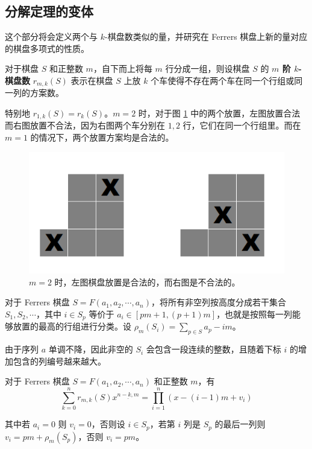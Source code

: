 \documentclass{noithesis}
\begin{document}
	\subsection{分解定理的变体}
	
	这个部分将会定义两个与 $k$-棋盘数类似的量，并研究在 Ferrers 棋盘上新的量对应的棋盘多项式的性质。
	
	\begin{definition}[$m$ 阶 $k$-棋盘数]
		对于棋盘 $S$ 和正整数 $m$，自下而上将每 $m$ 行分成一组，则设棋盘 $S$ 的\textbf{ $m$ 阶 $k$-棋盘数} $r_{m,k}(S)$ 表示在棋盘 $S$ 上放 $k$ 个车使得不存在两个车在同一个行组或同一列的方案数。
	\end{definition}
	
	特别地 $r_{1,k}(S) = r_k(S)$。$m=2$ 时，对于图 \ref{f8} 中的两个放置，左图放置合法而右图放置不合法，因为右图两个车分别在 $1,2$ 行，它们在同一个行组里。而在 $m=1$ 的情况下，两个放置方案均是合法的。
	
	\begin{figure}[h]
		\centering
		\caption{$m=2$ 时，左图棋盘放置是合法的，而右图是不合法的。}
		\label{f8}
		\includegraphics[scale=0.4]{picture/figure8.png}
	\end{figure}
	
	对于 Ferrers 棋盘 $S = F(a_1,a_2,\cdots,a_n)$，将所有非空列按高度分成若干集合 $S_1,S_2,\cdots$，其中 $i \in S_p$ 等价于 $a_i \in [pm+1 , (p+1)m]$，也就是按照每一列能够放置的最高的行组进行分类。设 $\rho_m(S_i) = \sum_{p \in S} a_p - im$。
	
	由于序列 $a$ 单调不降，因此非空的 $S_i$ 会包含一段连续的整数，且随着下标 $i$ 的增加包含的列编号越来越大。
	
	\begin{theorem}\label{mxiajiangmi}
		对于 Ferrers 棋盘 $S = F(a_1,a_2,\cdots,a_n)$ 和正整数 $m$，有\begin{equation}
		\sum_{k=0}^n r_{m,k}(S) x^{\underline{n-k,m}} = \prod_{i=1}^n (x-(i-1)m + v_i)
		\end{equation}
		
		其中若 $a_i = 0$ 则 $v_i = 0$，否则设 $i \in S_p$，若第 $i$ 列是 $S_p$ 的最后一列则 $v_i = pm + \rho_m(S_p)$，否则 $v_i = pm$。
	\end{theorem}
	
\end{document}
